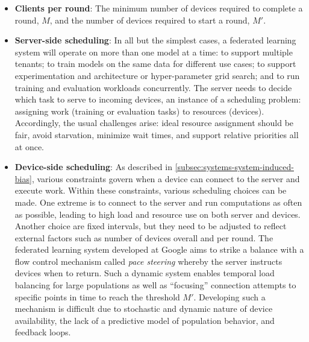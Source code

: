 \begin{itemize}
    \item \textbf{Clients per round}: The minimum number of devices required to complete a round, $M$, and the number of devices required to start a round, $M'$.
    \item \textbf{Server-side scheduling}: In all but the simplest cases, a federated learning system will operate on more than one model at a time: to support multiple tenants; to train models on the same data for different use cases; to support experimentation and architecture or hyper-parameter grid search; and to run training and evaluation workloads concurrently. The server needs to decide which task to serve to incoming devices, an instance of a scheduling problem: assigning work (training or evaluation tasks) to resources (devices). Accordingly, the usual challenges arise: ideal resource assignment should be fair, avoid starvation, minimize wait times, and support relative priorities all at once.
    \item \textbf{Device-side scheduling}: As described in \cref{subsec:systems-system-induced-bias}, various constraints govern when a device can connect to the server and execute work. Within these constraints, various scheduling choices can be made. One extreme is to connect to the server and run computations as often as possible, leading to high load and resource use on both server and devices. Another choice are fixed intervals, but they need to be adjusted to reflect external factors such as number of devices overall and per round. The federated learning system developed at Google aims to strike a balance with a flow control mechanism called \textit{pace steering} \citep{bonawitz19sysml} whereby the server instructs devices when to return. Such a dynamic system enables temporal load balancing for large populations as well as “focusing” connection attempts to specific points in time to reach the threshold $M'$. Developing such a mechanism is difficult due to stochastic and dynamic nature of device availability, the lack of a predictive model of population behavior, and feedback loops.
\end{itemize}
    
